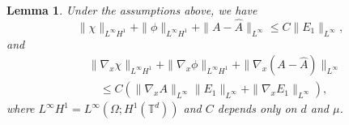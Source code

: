 \documentclass[reqno,12pt]{amsart} %
\newtheorem{lemma}[theorem]{Lemma}
\theoremstyle{definition}
\theoremstyle{remark}
\numberwithin{equation}{section}
\begin{document}
\begin{lemma}\label{lem_chi_E1}
  Under the assumptions above, we have
  \begin{equation}\label{est_E1}
      \|\chi\|_{L^\infty H^1}+\|\phi\|_{L^\infty H^1}+\|A-\widehat{A}\|_{L^\infty}\leq C\|E_1\|_{L^\infty},
  \end{equation}
  and
  \begin{equation}\label{est_chi_DE1}
  \begin{aligned}
    & \|\nabla_x\chi\|_{L^\infty H^1}+\|\nabla_x\phi\|_{L^\infty H^1}+\|\nabla_x(A-\widehat{A})\|_{L^\infty}\\
    &\quad\leq C(\|\nabla_xA\|_{L^\infty}\|E_1\|_{L^\infty}+\|\nabla_x E_1\|_{L^\infty}),
    \end{aligned}
  \end{equation}
  where $L^\infty H^1=L^\infty(\Omega; H^1(\mathbb{T}^d))$ and $C$ depends only on $d $ and $ \mu$. 
\end{lemma}
\end{document}

